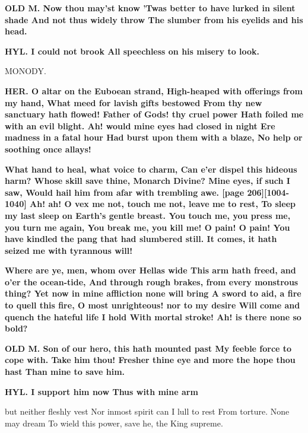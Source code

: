 \documentclass[11pt,letter]{book}
\begin{document}
\par \textbf{OLD M. Now thou may’st know ’Twas better to have lurked in silent shade And not thus widely throw The slumber from his eyelids and his head.}
\par 

\par \textbf{HYL. I could not brook All speechless on his misery to look.}
\par 

\par  MONODY.

\par \textbf{HER. O altar on the Euboean strand, High-heaped with offerings from my hand, What meed for lavish gifts bestowed From thy new sanctuary hath flowed! Father of Gods! thy cruel power Hath foiled me with an evil blight. Ah! would mine eyes had closed in night Ere madness in a fatal hour Had burst upon them with a blaze, No help or soothing once allays!}
\par 

\par \textbf{What hand to heal, what voice to charm, Can e’er dispel this hideous harm? Whose skill save thine, Monarch Divine? Mine eyes, if such I saw, Would hail him from afar with trembling awe. [page 206][1004-1040] Ah! ah! O vex me not, touch me not, leave me to rest, To sleep my last sleep on Earth’s gentle breast. You touch me, you press me, you turn me again, You break me, you kill me! O pain! O pain! You have kindled the pang that had slumbered still. It comes, it hath seized me with tyrannous will!}
\par 

\par \textbf{Where are ye, men, whom over Hellas wide This arm hath freed, and o’er the ocean-tide, And through rough brakes, from every monstrous thing? Yet now in mine affliction none will bring A sword to aid, a fire to quell this fire, O most unrighteous! nor to my desire Will come and quench the hateful life I hold With mortal stroke! Ah! is there none so bold?}
\par 

\par \textbf{OLD M. Son of our hero, this hath mounted past My feeble force to cope with. Take him thou! Fresher thine eye and more the hope thou hast Than mine to save him.}
\par 

\par \textbf{HYL. I support him now Thus with mine arm}
\par   but neither fleshly vest Nor inmost spirit can I lull to rest From torture. None may dream To wield this power, save he, the King supreme.
\end{document}
